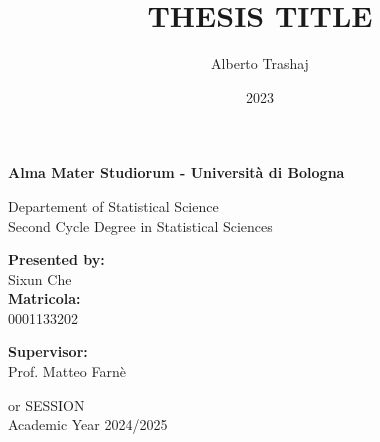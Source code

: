 \documentclass[12pt, a4paper]{report}
\newcommand{\RNum}[1]{\uppercase\expandafter{\romannumeral #1\relax}}
\theoremstyle{definition}
\theoremstyle{plain}
\theoremstyle{remark}
\begin{document}
\title{THESIS TITLE}
\author{Alberto Trashaj}
\date{2023}

\begin{titlepage}
    \begin{center}
        \vspace*{0.2cm}
        {\fontsize{19pt}{20pt}\selectfont \textbf{Alma Mater Studiorum - Università di Bologna}\par}
    
        \noindent\hrulefill
        \vspace{0.8cm}
        
        \Large
        
        Departement of Statistical Science \\
        Second Cycle Degree in Statistical Sciences
        
        
        
        \Large
        \vspace{5cm}
        {}

        
     
        \vspace{4.5cm}
         \begin{minipage}[t]{0.48\textwidth}
        \begin{flushleft}
            {\fontsize{16pt}{16pt}\textbf{Presented by:} \\ Sixun Che \\ \textbf{Matricola:} \\ 0001133202}
        \end{flushleft}
    \end{minipage} 
    \begin{minipage}[t]{0.48\textwidth}
        \begin{flushright}
            {\fontsize{16pt}{16pt}\textbf{Supervisor:} \\ Prof. Matteo Farnè}
        \end{flushright}
    \end{minipage}
        
        
        \vfill
        \noindent\hrulefill
        \vspace{0.3cm}
        \Large
        
       
        
        \RNum{1} \RNum{2} or \RNum{3} SESSION \\
        Academic Year 2024/2025
    \end{center}
\end{titlepage}
\restoregeometry
\vspace*{5cm}
\begin{flushright}
  {\parbox{4.2cm}{\textit{}}}
\end{flushright}
\end{document}
